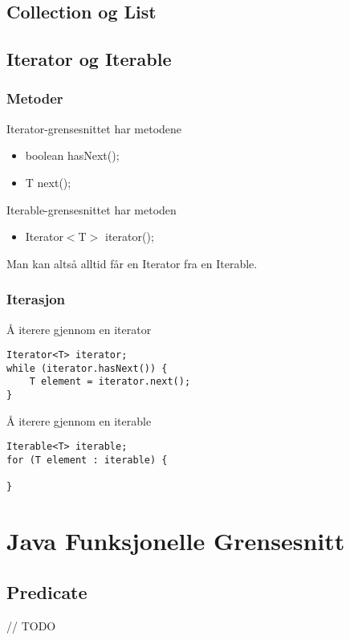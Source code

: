 \documentclass{article}
\begin{document}
\subsection{Collection og List}


\subsection{Iterator og Iterable}

\subsubsection{Metoder}
Iterator-grensesnittet har metodene
\begin{itemize}
    \item boolean hasNext();
    \item T next();
\end{itemize}
Iterable-grensesnittet har metoden
\begin{itemize}
    \item Iterator$<$T$>$ iterator();
\end{itemize}
Man kan altså alltid får en Iterator fra en Iterable.

\subsubsection{Iterasjon}

Å iterere gjennom en iterator
\begin{verbatim}
Iterator<T> iterator;
while (iterator.hasNext()) {
    T element = iterator.next();
}
\end{verbatim}
Å iterere gjennom en iterable
\begin{verbatim}
Iterable<T> iterable;
for (T element : iterable) {

}
\end{verbatim}

\section{Java Funksjonelle Grensesnitt}

\subsection{Predicate}
// TODO
\end{document}
